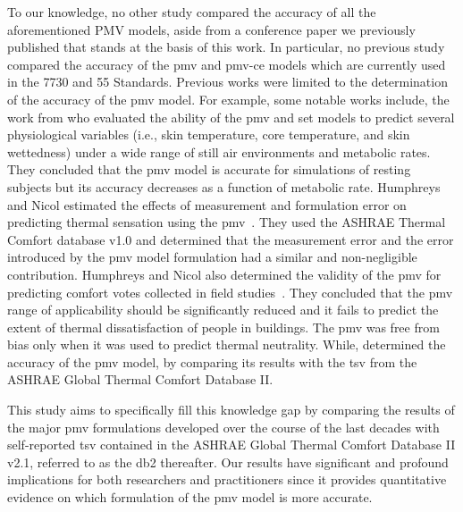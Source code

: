 To our knowledge, no other study compared the accuracy of all the aforementioned PMV models, aside from a conference paper we previously published that stands at the basis of this work.
In particular, no previous study compared the accuracy of the \ac{pmv} and \ac{pmv-ce} models which are currently used in the \gls{7730} and \gls{55} Standards.
Previous works were limited to the determination of the accuracy of the \ac{pmv} model.
For example, some notable works include, the work from  who evaluated the ability of the \ac{pmv} and \ac{set} models to predict several physiological variables (i.e., skin temperature, core temperature, and skin wettedness) under a wide range of still air environments and metabolic rates.
They concluded that the \ac{pmv} model is accurate for simulations of resting subjects but its accuracy decreases as a function of metabolic rate.
Humphreys and Nicol estimated the effects of measurement and formulation error on predicting thermal sensation using the \ac{pmv}~\cite{Humphreys2000}.
They used the ASHRAE Thermal Comfort database v1.0 and determined that the measurement error and the error introduced by the \ac{pmv} model formulation had a similar and non-negligible contribution.
Humphreys and Nicol also determined the validity of the \ac{pmv} for predicting comfort votes collected in field studies~\cite{Humphreys2002}.
They concluded that the \ac{pmv} range of applicability should be significantly reduced and it fails to predict the extent of thermal dissatisfaction of people in buildings.
The \ac{pmv} was free from bias only when it was used to predict thermal neutrality.
While,  determined the accuracy of the \ac{pmv} model, by comparing its results with the \ac{tsv} from the ASHRAE Global Thermal Comfort Database II.

This study aims to specifically fill this knowledge gap by comparing the results of the major \ac{pmv} formulations developed over the course of the last decades with self-reported \ac{tsv} contained in the ASHRAE Global Thermal Comfort Database II v2.1, referred to as the \gls{db2} thereafter.
Our results have significant and profound implications for both researchers and practitioners since it provides quantitative evidence on which formulation of the \ac{pmv} model is more accurate.